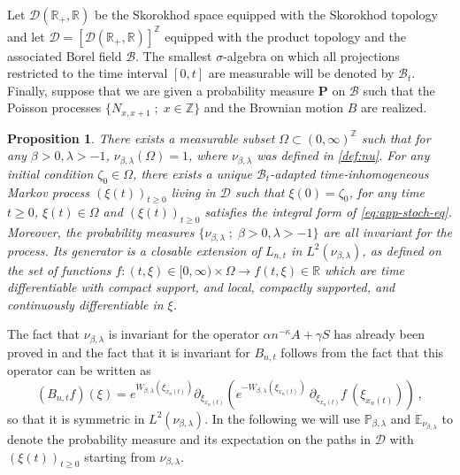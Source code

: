 \documentclass[a4paper, reqno, 12pt]{amsart}
\theoremstyle{plain}
\newtheorem{prop}[definition]{Proposition}
\theoremstyle{definition}
\begin{document}
Let $\mathcal D(\mathbb R_+, \mathbb R)$ be the Skorokhod space equipped with the Skorokhod topology and let ${\mathcal  D}= [\mathcal D(\mathbb R_+, \mathbb R)]^{\mathbb Z}$ equipped with the product topology and the associated Borel field ${\mathcal B}$. The smallest $\sigma$-algebra on which all projections restricted to the time interval $[0,t]$ are measurable will be denoted by ${\mathcal B}_t$. Finally, suppose that we are given a probability measure ${\mathbf P}$ on ${\mathcal  B}$ such that the Poisson processes $\{ N_{x,x+1} \; ; \; x \in \mathbb Z\}$ and the Brownian motion $B$ are realized.

\begin{prop} \label{prop:markovwellposed}
There exists a measurable subset $\Omega \subset (0, \infty)^{\mathbb Z}$ such that for any $\beta>0, \lambda>-1$, $\nu_{\beta, \lambda} (\Omega)=1$, where $\nu_{\beta, \lambda}$ was defined in \eqref{def:nu}. For any initial condition $\zeta_0 \in \Omega$, there exists a unique ${\mathcal B}_t$-adapted time-inhomogeneous Markov process $(\xi(t))_{t \ge 0}$  living in $\mathcal D $ such that  $\xi (0)=\zeta_0$, for any time $t\ge 0$, $\xi(t) \in \Omega$ and $(\xi(t))_{t \ge 0}$ satisfies the integral form of \eqref{eq:app-stoch-eq}. Moreover, the probability measures $\{ \nu_{\beta, \lambda} \; ; \; \beta>0, \lambda>-1\}$ are all invariant for the process.  Its generator is a closable extension of ${L_{n,t}}$ in $ L^2 (\nu_{\beta, \lambda})$, as defined on the set of functions $f: (t, \xi) \in [0, \infty) \times \Omega \to f(t, \xi) \in \mathbb R$ which are time differentiable with compact support, and local, compactly supported, and continuously differentiable in $\xi$.
\end{prop}

The fact that $\nu_{\beta, \lambda}$ is invariant for the operator $\alpha n^{-\kappa} A+\gamma S$ has already been proved in \cite{BG14} and the fact that it is invariant for $B_{n,t}$ follows from the fact that this operator can be written as
\begin{equation*}
(B_{n,t} f )(\xi) = e^{W_{\beta,\lambda} (\xi_{x_n(t)})} \partial_{\xi_{x_n(t)}} \left( e^{-W_{\beta,\lambda} (\xi_{x_n(t)})}\ \partial_{\xi_{x_n(t)}} f  \ (\xi_{x_n(t)}) \right) \ ,
\end{equation*} 
so that it is symmetric in $L^2(\nu_{\beta,\lambda})$.
In the following we will use $\mathbb P_{\beta,\lambda}$ and $\mathbb E_{\nu_{\beta,\lambda}}$ to denote the probability measure and its expectation on the paths in $\mathcal D$ with $(\xi(t))_{t\geq 0}$ starting from $\nu_{\beta,\lambda}$.
\end{document}
